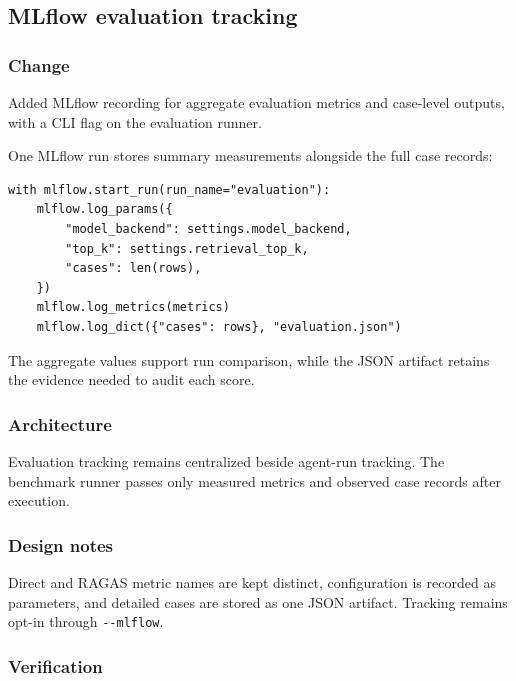 
\subsection{MLflow evaluation tracking}


\subsubsection{Change}

Added MLflow recording for aggregate evaluation metrics and case-level outputs, with a CLI flag on the evaluation runner.

One MLflow run stores summary measurements alongside the full case records:

\begin{verbatim}
with mlflow.start_run(run_name="evaluation"):
    mlflow.log_params({
        "model_backend": settings.model_backend,
        "top_k": settings.retrieval_top_k,
        "cases": len(rows),
    })
    mlflow.log_metrics(metrics)
    mlflow.log_dict({"cases": rows}, "evaluation.json")
\end{verbatim}

The aggregate values support run comparison, while the JSON artifact retains the evidence needed to audit each score.

\subsubsection{Architecture}

Evaluation tracking remains centralized beside agent-run tracking. The benchmark runner passes only measured metrics and observed case records after execution.

\subsubsection{Design notes}

Direct and RAGAS metric names are kept distinct, configuration is recorded as parameters, and detailed cases are stored as one JSON artifact. Tracking remains opt-in through \texttt{-\/-mlflow}.

\subsubsection{Verification}

